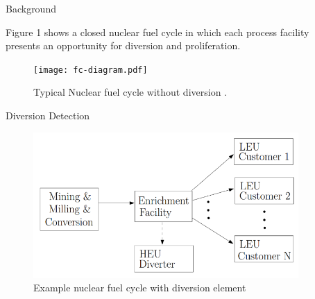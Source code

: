 \documentclass[final]{beamer}
\newlength{\sepwid}
\newlength{\onecolwid}
\newlength{\threecolwid}
\begin{document}
\begin{frame}[t]
\begin{columns}[t,totalwidth=\threecolwid]
\begin{column}{\onecolwid}
\begin{block}{Background}

Figure 1 shows a closed nuclear fuel cycle in which each process facility 
presents an opportunity for diversion and proliferation.

\begin{figure}
	\texttt{[image: fc-diagram.pdf]}
	\caption{Typical Nuclear fuel cycle without diversion \cite{huff_2018}.}
\end{figure}

\end{block}


\begin{block}{Diversion Detection}\end{block}

	\begin{figure}
		\includegraphics[width=0.9\linewidth]{Yilmaz_Graphic}
		\caption{Example nuclear fuel cycle with diversion element \cite{Yilmaz_2016}}
	\end{figure}



\end{column} %

\begin{column}{\sepwid}\end{column} %



\begin{column}{\onecolwid} %


\end{column}
\end{columns}
\end{frame}
\end{document}
